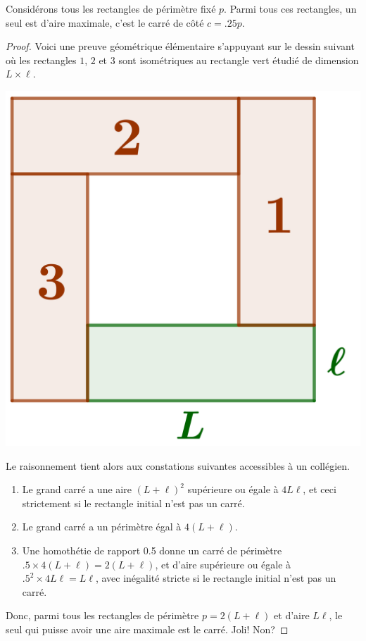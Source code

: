 \begin{fact} \label{iso-rect}
	Considérons tous les rectangles de périmètre fixé $p$. Parmi tous ces rectangles, un seul est d'aire maximale, c'est le carré de côté $c = \num{.25} p$.
\end{fact}


\begin{proof}
	Voici une preuve géométrique élémentaire s'appuyant sur le dessin suivant où les rectangles $1$, $2$ et $3$ sont isométriques au rectangle vert étudié de dimension $L \times \ell$.

	\begin{center}
		\includegraphics[scale=.4]{content/rectangle/rect-2-square.png}
	\end{center}
	
	Le raisonnement tient alors aux constations suivantes accessibles à un collégien.
	\begin{enumerate}
		\item Le grand carré a une aire $(L + \ell)^2$ supérieure ou égale à $4 L \ell$, et ceci strictement si le rectangle initial n'est pas un carré.

		\item Le grand carré a un périmètre égal à $4 (L + \ell)$.

		\item Une homothétie de rapport \num{.5} donne un carré 
		de périmètre $\num{.5} \times 4 (L + \ell) = 2 (L + \ell)$,
		et d'aire supérieure ou égale à $\num{.5}^2 \times 4 L \ell =  L \ell$, avec inégalité stricte si le rectangle initial n'est pas un carré.
	\end{enumerate}
	
	Donc, parmi tous les rectangles de périmètre $p = 2 (L + \ell)$ et d'aire $L \ell$, le seul qui puisse avoir une aire maximale est le carré. Joli! Non?
\end{proof}


